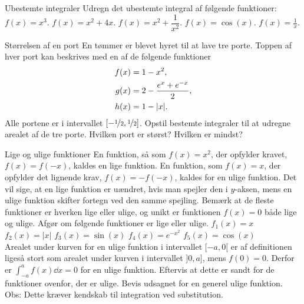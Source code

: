 \begin{opgave}[1]{Ubestemte integraler}
	Udregn det ubestemte integral af følgende funktioner:
	\opg $f(x) = x^3$.
	\opg $f(x) = x^2 + 4x$.
	\opg $f(x) = x^2 + \dfrac{1}{x^2}$.
	\opg $f(x) = \cos (x)$.
	\opg $f(x) = \frac{1}{x}$.
\end{opgave}
\begin{opgave}[2]{Størrelsen af en port}
    En tømmer er blevet hyret til at lave tre porte.
    Toppen af hver port kan beskrives med en af de følgende funktioner
    \begin{align*}
        f(x)&=1-x^2,\\
        g(x)&=2-\frac{e^x+e^{-x}}{2},\\
        h(x) &= 1-\abs{x}.        
    \end{align*}
    Alle portene er i intervallet $[-\nicefrac{1}{2},\nicefrac{1}{2}]$.
    \opg Opstil bestemte integraler til at udregne arealet af de tre porte.
    \opg Hvilken port er størst?
    \opg Hvilken er mindst?
\end{opgave}
\begin{opgave}[4]{Lige og ulige funktioner} \label{opg:lige/ulige}
En funktion, så som $f(x) = x^2$, der opfylder kravet, $f(x) = f(-x)$, kaldes en lige funktion. En funktion, som $f(x) = x$, der opfylder det lignende krav, $f(x)=-f(-x)$, kaldes for en ulige funktion.
Det vil sige, at en lige funktion er uændret, hvis man spejler den i $y$-aksen, mens en ulige funktion skifter fortegn ved den samme spejling.
Bemærk at de fleste funktioner er hverken lige eller ulige, og unikt er funktionen $f(x) = 0$ både lige og ulige.
Afgør om følgende funktioner er lige eller ulige.
\opg $f_1(x) = x$
\opg $f_2(x) = |x|$
\opg $f_3(x) = \sin(x)$
\opg $f_4(x) = e^{-x^2}$
\opg $f_5(x) = \cos(x)$ \\[2mm]
Arealet under kurven for en ulige funktion i intervallet $[-a,0[$ er af definitionen ligeså stort som arealet under kurven i intervallet $]0,a]$, mens $f(0)=0$. Derfor er $\int_{-a}^{a}f(x)\dd{x} = 0$ for en ulige funktion.
\opg Eftervis at dette er sandt for de funktioner ovenfor, der er ulige.
\opg Bevis udsagnet for en generel ulige funktion. Obs: Dette kræver kendskab til integration ved substitution.
\end{opgave}
